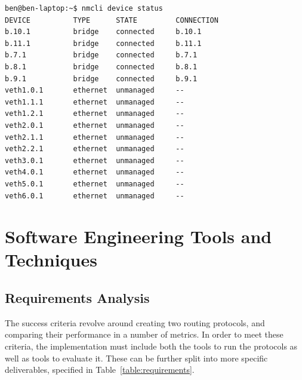 \documentclass[withindex,glossary,openany]{cam-thesis}
\begin{document}
\begin{minipage}{1\textwidth} \centering
\begin{lstlisting}[label=core_interfaces, frame=tb, caption=Virtualised network interfaces and bridges]
ben@ben-laptop:~$ nmcli device status
DEVICE          TYPE      STATE         CONNECTION
b.10.1          bridge    connected     b.10.1
b.11.1          bridge    connected     b.11.1
b.7.1           bridge    connected     b.7.1
b.8.1           bridge    connected     b.8.1
b.9.1           bridge    connected     b.9.1
veth1.0.1       ethernet  unmanaged     --
veth1.1.1       ethernet  unmanaged     --
veth1.2.1       ethernet  unmanaged     --
veth2.0.1       ethernet  unmanaged     --
veth2.1.1       ethernet  unmanaged     --
veth2.2.1       ethernet  unmanaged     --
veth3.0.1       ethernet  unmanaged     --
veth4.0.1       ethernet  unmanaged     --
veth5.0.1       ethernet  unmanaged     --
veth6.0.1       ethernet  unmanaged     --
\end{lstlisting}
\end{minipage}

\section{Software Engineering Tools and Techniques}

\subsection{Requirements Analysis}

The success criteria revolve around creating two routing protocols, and comparing their performance in a number of metrics. In order to meet these criteria, the implementation must include both the tools to run the protocols as well as tools to evaluate it. These can be further split into more specific deliverables,
specified in Table~\ref{table:requirements}.
\end{document}
